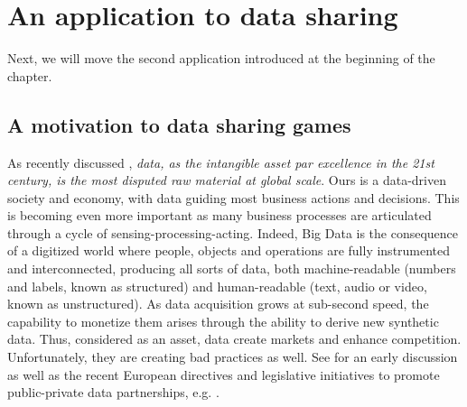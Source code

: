 
\section{An application to data sharing}\label{sec:ds}
Next, we will move the second application introduced at the beginning of the chapter.

\subsection{A motivation to data sharing games}

As recently discussed \parencite{wolfram}, {\em data, as the intangible asset par excellence in the 21st century, is the most disputed raw material at global scale}. Ours is a data-driven society and economy,
with  data guiding most business actions and decisions. 
This is becoming even more important as
many business processes are articulated through a 
cycle of sensing-processing-acting. Indeed, Big Data is the
consequence of a digitized world where people, objects and operations are fully instrumented and interconnected, producing all sorts of data, both machine-readable (numbers and labels, known as
structured) and human-readable (text, audio or video, known as unstructured).
As data acquisition grows at sub-second speed, the capability to monetize
them arises through the ability to derive new synthetic data. 
Thus, considered as an asset, data create markets and enhance 
competition. Unfortunately, they are creating bad practices as well.
See \parencite{share} for an early discussion 
as well as the 
recent European directives and legislative initiatives to 
promote public-private data partnerships, e.g. \parencite{europe1}.

